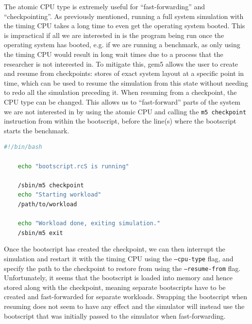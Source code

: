     The atomic CPU type is extremely useful for ``fast-forwarding'' and 
    ``checkpointing''. As previously mentioned, running a full system 
    simulation with the timing CPU takes a long time to even get the operating 
    system booted. This is impractical if all we are interested in is the 
    program being run once the operating system has booted, e.g. if we are 
    running a benchmark, as only using the timing CPU would result in long wait 
    times due to a process that the researcher is not interested in. To mitigate
    this, gem5 allows the user to create and resume from checkpoints: stores of 
    exact system layout at a specific point in time, which can be used to resume
    the simulation from this state without needing to redo all the simulation 
    preceding it. When resuming from a checkpoint, the CPU type can be changed.
    This allows us to ``fast-forward'' parts of the system we are not interested
    in by using the atomic CPU and calling the \texttt{m5 checkpoint} 
    instruction from within the bootscript, before the line(s) where the 
    bootscript starts the benchmark.
    \begin{lstlisting}[language=bash, caption=Example bootscript using 
    checkpointing, basicstyle=\sffamily\footnotesize]
    #!/bin/bash
    
    echo "bootscript.rcS is running"
    
    /sbin/m5 checkpoint
    echo "Starting workload"
    /path/to/workload
    
    echo "Workload done, exiting simulation."
    /sbin/m5 exit
    \end{lstlisting}
    Once the bootscript has created the checkpoint, we can then interrupt the 
    simulation and restart it with the timing CPU using the \texttt{--cpu-type} 
    flag, and specify the path to the checkpoint to restore from using the 
    \texttt{--resume-from} flag. Unfortunately, it seems that the bootscript is 
    loaded into memory and hence stored along with the checkpoint, meaning 
    separate bootscripts have to be created and fast-forwarded for separate 
    workloads. Swapping the bootscript when resuming does not seem to have any 
    effect and the simulator will instead use the bootscript that was initially 
    passed to the simulator when fast-forwarding.
    
